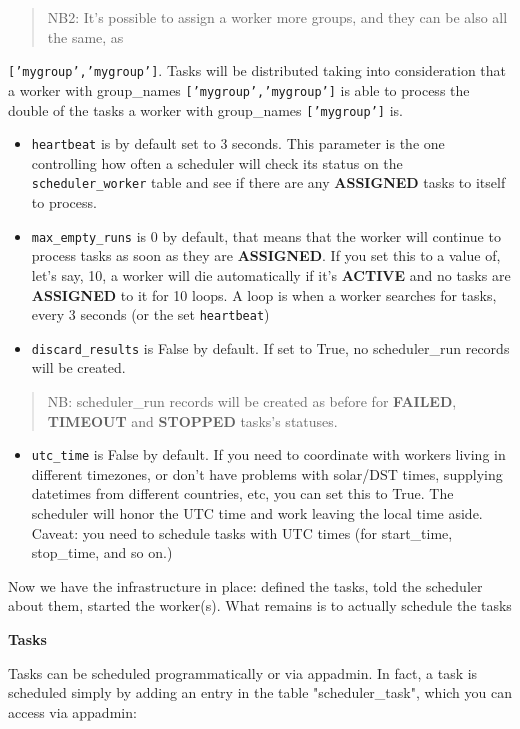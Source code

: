 \documentclass[justified,sixbynine,notoc]{tufte-book}
\def\ft{\small\tt}
\begin{document}
\begin{fullwidth}
\begin{quote}
NB2: It's possible to assign a worker more groups, and they can be also all the same, as\end{quote}{\ft ['mygroup','mygroup']}. Tasks will be distributed taking into consideration that
a worker with group\_names {\ft ['mygroup','mygroup']} is able to process the double of the tasks
a worker with group\_names {\ft ['mygroup']} is.
\begin{itemize}
\item {\ft heartbeat} is by default set to 3 seconds. This parameter is the one controlling how often a scheduler will check its status on the {\ft scheduler\_worker} table and see if there are any {\bf ASSIGNED} tasks to itself to process.

\item {\ft max\_empty\_runs} is 0 by default, that means that the worker will continue to process tasks as soon as they are {\bf ASSIGNED}. If you set this to a value of, let's say, 10, a worker will die automatically if it's {\bf ACTIVE} and no tasks are {\bf ASSIGNED} to it for 10 loops. A loop is when a worker searches for tasks, every 3 seconds (or the set {\ft heartbeat})

\item {\ft discard\_results} is False by default. If set to True, no scheduler\_run records will be created.
\end{itemize}

\begin{quote}NB: scheduler\_run records will be created as before for {\bf FAILED}, {\bf TIMEOUT} and {\bf STOPPED} tasks's statuses.\end{quote}
\begin{itemize}
\item {\ft utc\_time} is False by default. If you need to coordinate with workers living in different timezones, or don't have problems with solar/DST times, supplying datetimes from different countries, etc, you can set this to True. The scheduler will honor the UTC time and work leaving the local time aside. Caveat: you need to schedule tasks with UTC times (for start\_time, stop\_time, and so on.)
\end{itemize}

Now we have the infrastructure in place: defined the tasks, told the scheduler about them, started the worker(s). What remains is to actually schedule the tasks

{\bf Tasks}

Tasks can be scheduled programmatically or via appadmin. In fact, a task is scheduled simply by adding an entry in the table "scheduler\_task", which you can access via appadmin:


\end{fullwidth}
\end{document}
